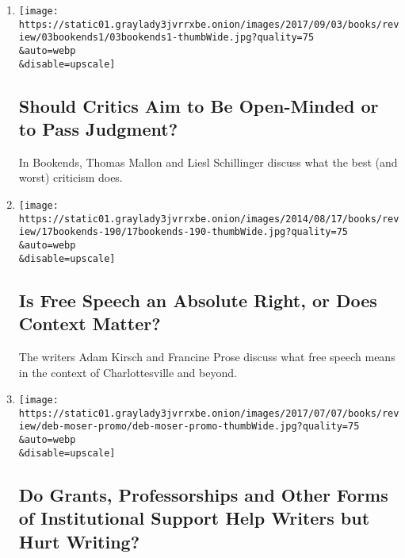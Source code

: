 \begin{enumerate}
\def\labelenumi{\arabic{enumi}.}
\item
  \href{/2017/08/29/books/review/criticism-objectivity-judgement.html}{}

  \texttt{[image: https://static01.graylady3jvrrxbe.onion/images/2017/09/03/books/review/03bookends1/03bookends1-thumbWide.jpg?quality=75\\\&auto=webp\\\&disable=upscale]}

  \hypertarget{should-critics-aim-to-be-open-minded-or-to-pass-judgment}{%
  \subsection{Should Critics Aim to Be Open-Minded or to Pass
  Judgment?}\label{should-critics-aim-to-be-open-minded-or-to-pass-judgment}}

  In Bookends, Thomas Mallon and Liesl Schillinger discuss what the best
  (and worst) criticism does.
\item
  \href{/2017/08/24/books/review/free-speech-hate-charlottesville.html}{}

  \texttt{[image: https://static01.graylady3jvrrxbe.onion/images/2014/08/17/books/review/17bookends-190/17bookends-190-thumbWide.jpg?quality=75\\\&auto=webp\\\&disable=upscale]}

  \hypertarget{is-free-speech-an-absolute-right-or-does-context-matter}{%
  \subsection{Is Free Speech an Absolute Right, or Does Context
  Matter?}\label{is-free-speech-an-absolute-right-or-does-context-matter}}

  The writers Adam Kirsch and Francine Prose discuss what free speech
  means in the context of Charlottesville and beyond.
\item
  \href{/2017/07/07/books/review/do-grants-professorships-and-other-forms-of-institutional-support-help-writers-but-hurt-writing.html}{}

  \texttt{[image: https://static01.graylady3jvrrxbe.onion/images/2017/07/07/books/review/deb-moser-promo/deb-moser-promo-thumbWide.jpg?quality=75\\\&auto=webp\\\&disable=upscale]}

  \hypertarget{do-grants-professorships-and-other-forms-of-institutional-support-help-writers-but-hurt-writing}{%
  \subsection{Do Grants, Professorships and Other Forms of Institutional
  Support Help Writers but Hurt
  Writing?}\label{do-grants-professorships-and-other-forms-of-institutional-support-help-writers-but-hurt-writing}}


\end{enumerate}
